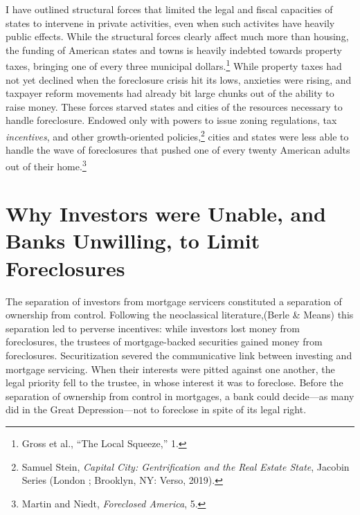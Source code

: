 \documentclass[12pt,oneside]{psthesis}
\begin{document}
I have outlined structural forces that limited the legal and fiscal capacities of states to intervene in private activities, even when such activites have heavily public effects.
While the structural forces clearly affect much more than housing, the funding of American states and towns is heavily indebted towards property taxes, bringing one of every three municipal dollars.\footnote{Gross et al., ``The Local Squeeze,'' 1.}
While property taxes had not yet declined when the foreclosure crisis hit its lows, anxieties were rising, and taxpayer reform movements had already bit large chunks out of the ability to raise money.
These forces starved states and cities of the resources necessary to handle foreclosure.
Endowed only with powers to issue zoning regulations, tax \emph{incentives}, and other growth-oriented policies,\footnote{Samuel Stein, \emph{Capital City: Gentrification and the Real Estate State}, Jacobin Series (London ; Brooklyn, NY: Verso, 2019).} cities and states were less able to handle the wave of foreclosures that pushed one of every twenty American adults out of their home.\footnote{Martin and Niedt, \emph{Foreclosed America}, 5.}

\hypertarget{banks}{%
\section{Why Investors were Unable, and Banks Unwilling, to Limit Foreclosures}\label{banks}}

The separation of investors from mortgage servicers constituted a separation of ownership from control.
Following the neoclassical literature,(Berle \& Means) this separation led to perverse incentives: while investors lost money from foreclosures, the trustees of mortgage-backed securities gained money from foreclosures.
Securitization severed the communicative link between investing and mortgage servicing.
When their interests were pitted against one another, the legal priority fell to the trustee, in whose interest it was to foreclose.
Before the separation of ownership from control in mortgages, a bank could decide---as many did in the Great Depression---not to foreclose in spite of its legal right.
\end{document}
